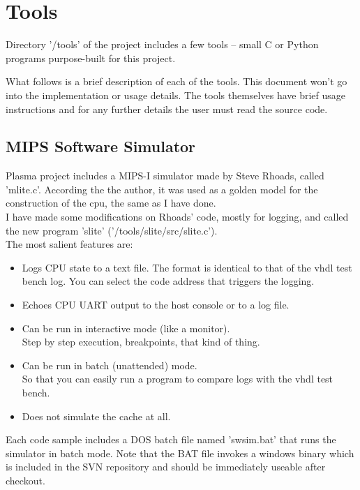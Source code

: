    
\chapter{Tools}
\label{tools}

    Directory '/tools' of the project includes a few tools -- small C or Python
    programs purpose-built for this project.
    
    What follows is a brief description of each of the tools. This document
    won't go into the implementation or usage details. The tools themselves have 
    brief usage instructions and for any further details the user must read
    the source code.
    
    

\section{MIPS Software Simulator}
\label{sw_simulator}

    Plasma project includes a MIPS-I simulator made by Steve Rhoads, called
    'mlite.c'. According the the author, it was used as a golden model for the
    construction of the cpu, the same as I have done.\\
    I have made some modifications on Rhoads' code, mostly for logging, and
    called the new program 'slite' ('/tools/slite/src/slite.c').\\
    
    The most salient features are:
    
    \begin{itemize}
    \item Logs CPU state to a text file.
        The format is identical to that of the vhdl test bench log.
        You can select the code address that triggers the logging.
    \item Echoes CPU UART output to the host console or to a log file.
    \item Can be run in interactive mode (like a monitor).\\
        Step by step execution, breakpoints, that kind of thing.
    \item Can be run in batch (unattended) mode.\\
        So that you can easily run a program to compare logs with the 
        vhdl test bench.
    \item Does not simulate the cache at all.
    \end{itemize}
    
    Each code sample includes a DOS batch file named 'swsim.bat' that runs the
    simulator in batch mode. Note that the BAT file invokes a windows binary
    which is included in the SVN repository and should be immediately useable
    after checkout.\\ 
    
